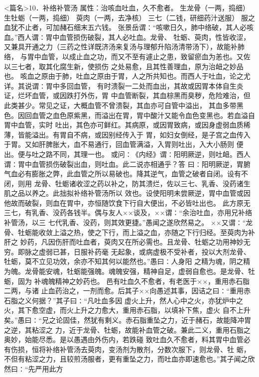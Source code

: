 \documentclass[a4paper,12pt,UTF8,twoside]{ctexbook}
\begin{document}
<篇名>10．补络补管汤
属性：治咳血吐血，久不愈者。 
生龙骨（一两，捣细） 生牡蛎（一两，捣细） 萸肉（一两，去净核） 三七（二钱，研细药汁送服） 
服之血犹不止者，可加赭石细末五六钱。 
张景岳谓∶“咳嗽日久，肺中络破，其人必咳血。”西人谓∶胃中血管损伤破裂，其人必吐血。龙骨、 
牡蛎、萸肉，性皆收涩，又兼具开通之力（三药之性详既济汤来复汤与理郁升陷汤清带汤下），故能补肺络， 
与胃中血管，以成止血之功，而又不至有遽止之患，致留瘀血为恙也。又佐以三七者，取其化腐生新，使损伤 
之处易愈，且其性善理血，原为治衄之妙品也。 
咳血之原由于肺，吐血之原由于胃，人之所共知也。而西人于吐血，论之尤详。其说谓∶胃中多回血管， 
有时溃裂一二处而血出，其故或因胃本体自生炎证，烂坏血管，或因跌打外伤，胃 
中血管断裂，其血棕黑而臭秽，危险难治，但此类甚少。常见之证，大概血管不曾溃裂，其血亦可自管中溢出， 
其血多带黑色。因回血管之血色原紫黑，而溢出在胃，胃中酸汁又能令血色变黑也。若血溢自胃中血管，实时 
吐出，其色亦可鲜红。其病原，或因胃致病，或因身虚弱血质稀薄，皆能溢出。有胃自不病，或因别经传入于 
胃，如妇女倒经，是子宫之血传入于胃。又如肝脾胀大，血不易通行，回血管满溢，入胃则吐出，入大小肠则 
便出。便与吐之路不同，其理一也。 
或问∶《内经》谓∶阳明厥逆，则吐衄。西人谓∶胃中血管损伤破裂出血，则吐血。此二说亦相通乎？答 
曰∶阳明厥逆，胃腑气血必有膨胀之弊，此血管之所以易破也。降其逆气，血管之破者自闭。设有不闭，则用 
龙骨、牡蛎诸收涩之药以补之，防其溃烂，佐以三七、乳香、没药诸生肌之品以养之。此拙拟补络补管汤所以 
效也。设使阳明未尝厥逆，胃中血管或因他故而破裂，则血在胃中，亦恒随饮食下行自大便出，不必皆吐出也。 
此方原无三七，有乳香、没药各钱半。偶与友人××谈及，××谓∶“余治吐血，亦用兄补络补管汤，以三 
七代乳香、没药，则其效更捷。”愚闻之遂欣然易之。 
××又谓∶“龙骨、牡蛎能收敛上溢之热，使之下行，而上溢之血，亦随之下行归经。至萸肉为补肝之 
妙药，凡因伤肝而吐血者，萸肉又在所必需也。且龙骨、牡蛎之功用神妙无穷。即脉之虚弱已甚，日服补药毫 
无起象，或病虚极不受补者，投以大剂龙骨、牡蛎，莫不立见功效，余亦不知其何以能然也。”愚曰∶人身阳 
之精为魂，阴之精为魄。龙骨能安魂，牡蛎能强魄。魂魄安强，精神自足，虚弱自愈也。是龙骨、牡蛎，固为 
补魂魄精神之妙药也。 
邑有吐血久不愈者，有老医于××，重用赤石脂二两，与诸 
止血药治之，一剂而愈。后其子××向愚述其事，因诘之曰∶“重用赤石脂之义何据？”其子曰∶“凡吐血多因 
虚火上升，然人心中之火，亦犹炉中之火，其下愈空虚，而火上升之力愈大，重用赤石脂，以填补下焦，虚火 
自不上升矣。”愚曰∶“兄之论固佳，然犹有剩义。赤石脂重坠之力，近于赭石，故能降冲胃之逆，其粘涩之 
力，近于龙骨、牡蛎，故能补血管之破。兼此二义，重用石脂之奥妙，始能尽悉。是以愚遇由外伤内，若跌碰 
致吐血久不愈者，料其胃中血管必有伤损，恒将补络补管汤去萸肉，变汤剂为散剂，分数次服下，则龙骨、牡 
蛎，不但有粘涩之力，且较煎汤服者，更有重坠之力，而吐血亦即速愈也。”其子闻之欣然曰∶“先严用此方 
\end{document}
